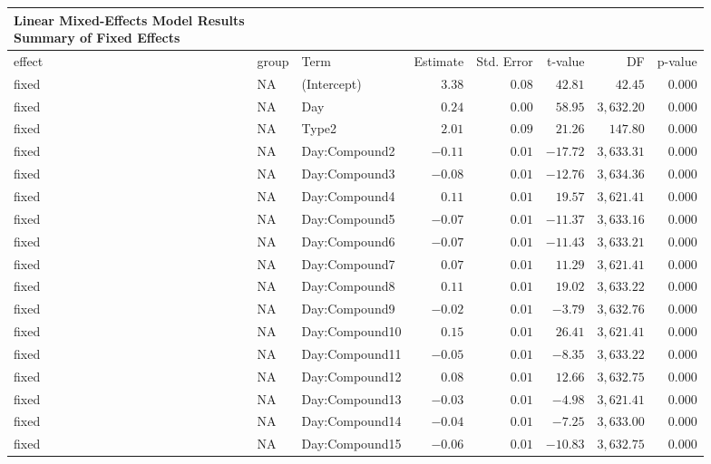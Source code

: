 \begin{longtable}{lllrrrrr}
\caption*{
{\large Linear Mixed-Effects Model Results} \\ 
{\small Summary of Fixed Effects}
} \\ 
\toprule
effect & group & Term & Estimate & Std. Error & t-value & DF & p-value \\ 
\midrule\addlinespace[2.5pt]
fixed & NA & (Intercept) & $3.38$ & $0.08$ & $42.81$ & $42.45$ & $0.000$ \\ 
fixed & NA & Day & $0.24$ & $0.00$ & $58.95$ & $3,632.20$ & $0.000$ \\ 
fixed & NA & Type2 & $2.01$ & $0.09$ & $21.26$ & $147.80$ & $0.000$ \\ 
fixed & NA & Day:Compound2 & $-0.11$ & $0.01$ & $-17.72$ & $3,633.31$ & $0.000$ \\ 
fixed & NA & Day:Compound3 & $-0.08$ & $0.01$ & $-12.76$ & $3,634.36$ & $0.000$ \\ 
fixed & NA & Day:Compound4 & $0.11$ & $0.01$ & $19.57$ & $3,621.41$ & $0.000$ \\ 
fixed & NA & Day:Compound5 & $-0.07$ & $0.01$ & $-11.37$ & $3,633.16$ & $0.000$ \\ 
fixed & NA & Day:Compound6 & $-0.07$ & $0.01$ & $-11.43$ & $3,633.21$ & $0.000$ \\ 
fixed & NA & Day:Compound7 & $0.07$ & $0.01$ & $11.29$ & $3,621.41$ & $0.000$ \\ 
fixed & NA & Day:Compound8 & $0.11$ & $0.01$ & $19.02$ & $3,633.22$ & $0.000$ \\ 
fixed & NA & Day:Compound9 & $-0.02$ & $0.01$ & $-3.79$ & $3,632.76$ & $0.000$ \\ 
fixed & NA & Day:Compound10 & $0.15$ & $0.01$ & $26.41$ & $3,621.41$ & $0.000$ \\ 
fixed & NA & Day:Compound11 & $-0.05$ & $0.01$ & $-8.35$ & $3,633.22$ & $0.000$ \\ 
fixed & NA & Day:Compound12 & $0.08$ & $0.01$ & $12.66$ & $3,632.75$ & $0.000$ \\ 
fixed & NA & Day:Compound13 & $-0.03$ & $0.01$ & $-4.98$ & $3,621.41$ & $0.000$ \\ 
fixed & NA & Day:Compound14 & $-0.04$ & $0.01$ & $-7.25$ & $3,633.00$ & $0.000$ \\ 
fixed & NA & Day:Compound15 & $-0.06$ & $0.01$ & $-10.83$ & $3,632.75$ & $0.000$ \\ 
\bottomrule
\end{longtable}

